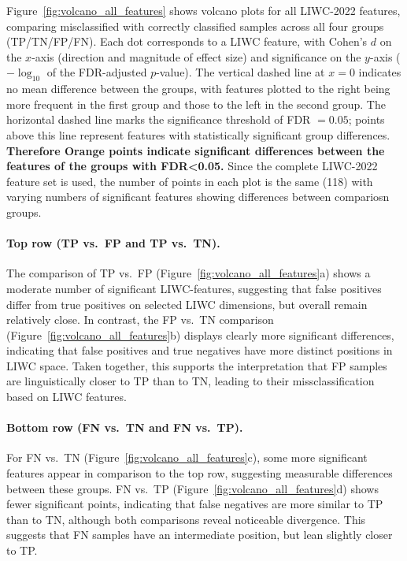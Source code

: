 Figure~\ref{fig:volcano_all_features} shows volcano plots for all LIWC-2022 features, comparing misclassified with correctly classified samples across all four groups (TP/TN/FP/FN). 
Each dot corresponds to a LIWC feature, with Cohen’s $d$ \cite{cohen1988} on the $x$-axis (direction and magnitude of effect size) and significance on the $y$-axis ($-\log_{10}$ of the FDR-adjusted $p$-value). The vertical dashed line at $x=0$ indicates no mean difference between the groups, with features plotted to the right being more frequent in the first group and those to the left in the second group. 
The horizontal dashed line marks the significance threshold of FDR $=0.05$; points above this line represent features with statistically significant group differences. \textbf{Therefore Orange points indicate significant differences between the features of the groups with FDR<0.05.} Since the complete LIWC-2022 feature set is used, the number of points in each plot is the same (118) with varying numbers of significant features showing differences between compariosn groups.

\paragraph{Top row (TP vs.\ FP and TP vs.\ TN).}
The comparison of TP vs.\ FP (Figure~\ref{fig:volcano_all_features}a) shows a moderate number of significant LIWC-features,  suggesting that false positives differ from true positives on selected LIWC dimensions, but overall remain relatively close. 
In contrast, the FP vs.\ TN comparison (Figure~\ref{fig:volcano_all_features}b) displays clearly more significant differences, indicating that false positives and true negatives have more distinct positions in LIWC space. 
Taken together, this supports the interpretation that FP samples are linguistically closer to TP than to TN, leading to their missclassification based on LIWC features.

\paragraph{Bottom row (FN vs.\ TN and FN vs.\ TP).}
For FN vs.\ TN (Figure~\ref{fig:volcano_all_features}c), some more significant features appear in comparison to the top row, suggesting measurable differences between these groups. 
FN vs.\ TP (Figure~\ref{fig:volcano_all_features}d) shows fewer significant points, indicating that false negatives are more similar to TP than to TN, although both comparisons reveal noticeable divergence. This suggests that FN samples have an intermediate position, but lean slightly closer to TP.

